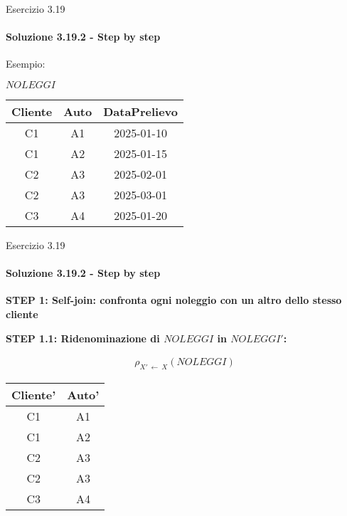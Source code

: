 \begin{frame}{Esercizio 3.19}
    \framesubtitle{Soluzione 3.19.2 - Step by step}
    \vspace*{-2cm}

    {\small Esempio:}

    \small
    \centering
    $NOLEGGI$

    \begin{tabular}{|c|c|c|}
    \hline
    \rowcolor{cyan!30} Cliente  & Auto & DataPrelievo \\
    \hline
    C1 & A1 & 2025-01-10 \\
    \hline
    C1 & A2 & 2025-01-15 \\
    \hline
    C2 & A3 & 2025-02-01 \\
    \hline
    C2 & A3 & 2025-03-01 \\
    \hline
    C3 & A4 & 2025-01-20 \\
    \hline
    \end{tabular}
\end{frame}
%
\begin{frame}{Esercizio 3.19}
    \framesubtitle{Soluzione 3.19.2 - Step by step}
    \vspace*{-1cm}

    {\small \textbf{STEP 1: Self-join: confronta ogni noleggio con un altro dello stesso cliente}}
    
    \vspace{.3cm}

    {\small \textbf{STEP 1.1: Ridenominazione di $NOLEGGI$ in $NOLEGGI'$:}}
    
    \small
    \begin{gather*}
        \rho_{X'~\leftarrow~X} (NOLEGGI)
    \end{gather*}
    
    \centering
    
    \begin{tabular}{|c|c|}
    \hline
    \rowcolor{cyan!30} Cliente' & Auto' \\
    \hline
    C1 & A1 \\
    \hline
    C1 & A2 \\
    \hline
    C2 & A3 \\
    \hline
    C2 & A3 \\
    \hline
    C3 & A4 \\
    \hline
    \end{tabular}
\end{frame}
